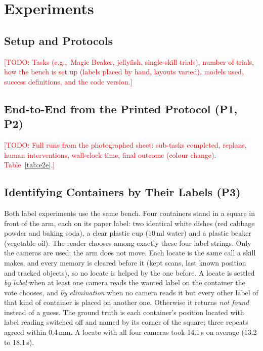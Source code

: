\documentclass[letterpaper, 10pt, journal, twoside]{IEEEtran}}
\newcommand{\todo}[1]{\textcolor{red}{[TODO: #1]}}
\newcommand{\eg}{e.g.,\ }
\begin{document}
\section{Experiments}
\label{sec:experiments}


\subsection{Setup and Protocols}
\todo{Tasks (\eg Magic Beaker, jellyfish, single-skill trials), number of
trials, how the bench is set up (labels placed by hand, layouts varied),
models used, success definitions, and the code version.}

\subsection{End-to-End from the Printed Protocol (P1, P2)}
\todo{Full runs from the photographed sheet: sub-tasks completed, replans,
human interventions, wall-clock time, final outcome (colour change).
Table~\ref{tab:e2e}.}

\subsection{Identifying Containers by Their Labels (P3)}
\label{sec:exp_labels}

Both label experiments use the same bench. Four containers stand in a
square in front of the arm, each on its paper label: two identical white
dishes (red cabbage powder and baking soda), a clear plastic cup (10\,ml
water) and a plastic beaker (vegetable oil). The reader chooses among
exactly these four label strings. Only the cameras are used; the arm does
not move. Each locate is the same call a skill makes, and every memory is
cleared before it (kept scans, last known position and tracked objects),
so no locate is helped by the one before. A locate is settled \emph{by
label} when at least one camera reads the wanted label on the container
the vote chooses, and \emph{by elimination} when no camera reads it but
every other label of that kind of container is placed on another one.
Otherwise it returns \emph{not found} instead of a guess. The ground truth
is each container's position located with label reading switched off and
named by its corner of the square; three repeats agreed within 0.4\,mm. A
locate with all four cameras took 14.1\,s on average (13.2 to 18.1\,s).
\end{document}

